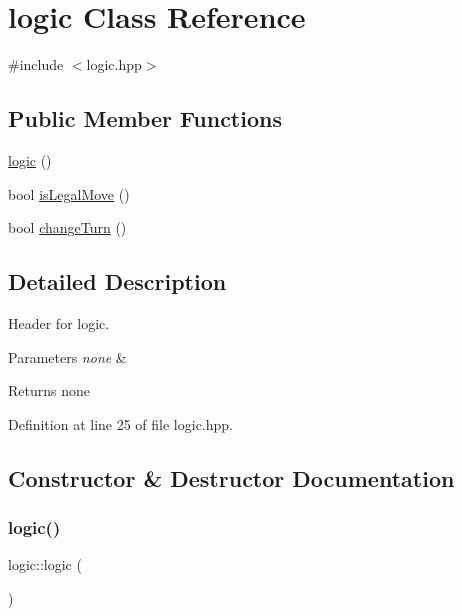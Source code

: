 \hypertarget{classlogic}{}\section{logic Class Reference}
\label{classlogic}


{\ttfamily \#include $<$logic.\+hpp$>$}

\subsection*{Public Member Functions}
\begin{DoxyCompactItemize}
\item 
\mbox{\hyperlink{classlogic_a2e8c1ac53198a709ddfccdd002d9dac6}{logic}} ()
\item 
bool \mbox{\hyperlink{classlogic_af7266d036a6df1328c85b8ea6bfb0fab}{is\+Legal\+Move}} ()
\item 
bool \mbox{\hyperlink{classlogic_ae9ff5d7c6cbe86bf69e338e9bb7c0d6c}{change\+Turn}} ()
\end{DoxyCompactItemize}


\subsection{Detailed Description}
Header for logic.


\begin{DoxyParams}{Parameters}
{\em none} & \\
\hline
\end{DoxyParams}
\begin{DoxyReturn}{Returns}
none 
\end{DoxyReturn}


Definition at line 25 of file logic.\+hpp.



\subsection{Constructor \& Destructor Documentation}
\mbox{\label{classlogic_a2e8c1ac53198a709ddfccdd002d9dac6}} 
\subsubsection{\texorpdfstring{logic()}{logic()}}
{\footnotesize\ttfamily logic\+::logic (\begin{DoxyParamCaption}{ }\end{DoxyParamCaption})}

